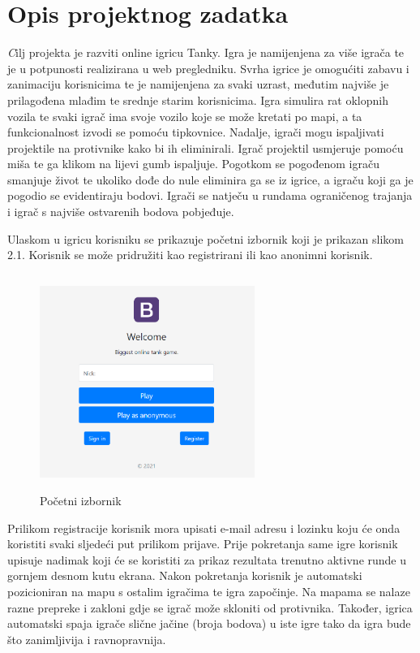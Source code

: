 \chapter{Opis projektnog zadatka}
		
\textit Cilj projekta je razviti online igricu Tanky. Igra je namijenjena za više igrača te je u potpunosti realizirana u web pregledniku. Svrha igrice je omogućiti zabavu i zanimaciju korisnicima te je namijenjena za svaki uzrast, međutim najviše je prilagođena mlađim te srednje starim korisnicima. Igra simulira rat oklopnih vozila te svaki igrač ima svoje vozilo koje se može kretati po mapi, a ta funkcionalnost izvodi se pomoću tipkovnice. Nadalje, igrači mogu ispaljivati projektile na protivnike kako bi ih eliminirali. Igrač projektil usmjeruje pomoću miša te ga klikom na lijevi gumb ispaljuje. Pogotkom se pogođenom igraču smanjuje život te ukoliko dođe do nule eliminira ga se iz igrice, a igraču koji ga je pogodio se evidentiraju bodovi. Igrači se natječu u rundama ograničenog trajanja i igrač s najviše ostvarenih bodova pobjeđuje.

Ulaskom u igricu korisniku se prikazuje početni izbornik koji je prikazan slikom 2.1. Korisnik se može pridružiti kao registrirani ili kao anonimni korisnik. 

\begin{figure}[h]
	\centering
	\includegraphics[width=7cm,height=7cm]{startMenu}
	\caption{Početni izbornik}
	\label{fig:opis}
\end{figure}

Prilikom registracije korisnik mora upisati e-mail adresu i lozinku koju će onda koristiti svaki sljedeći put prilikom prijave. 
Prije pokretanja same igre korisnik upisuje nadimak koji će se koristiti za prikaz rezultata trenutno aktivne runde u gornjem desnom kutu ekrana. Nakon pokretanja korisnik je automatski pozicioniran na mapu s ostalim igračima te igra započinje. Na mapama se nalaze razne prepreke i zakloni gdje se igrač može skloniti od protivnika. Također, igrica automatski spaja igrače slične jačine (broja bodova) u iste igre tako da igra bude što zanimljivija i ravnopravnija.

